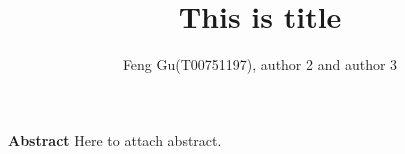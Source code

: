 \documentclass[12pt]{article}
\title{
This is title
}
\author{Feng Gu(T00751197), author 2 and author 3}
\begin{document}
\maketitle

\begin{center}
    \textbf{\large Abstract}
    Here to attach abstract.
\end{center}

% 
% 
% 
% 
% 




\clearpage
% 
% 
\end{document}
